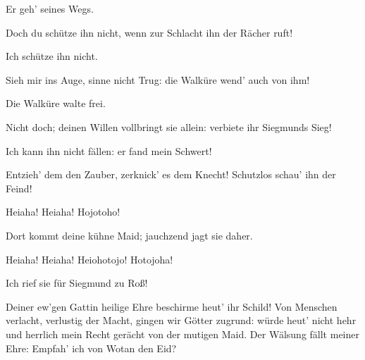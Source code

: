 \begin{drama}
\Wotanspeaks


Er geh' seines Wegs.
 

\Frickaspeaks
Doch du schütze ihn nicht,
wenn zur Schlacht ihn der Rächer ruft!
 

\Wotanspeaks
Ich schütze ihn nicht.
 

\Frickaspeaks
Sieh mir ins Auge, sinne nicht Trug:
die Walküre wend' auch von ihm!
 

\Wotanspeaks
Die Walküre walte frei.
 

\Frickaspeaks
Nicht doch; deinen Willen vollbringt sie allein:
verbiete ihr Siegmunds Sieg!
 

\Wotanspeaks


Ich kann ihn nicht fällen: er fand mein Schwert!
 

\Frickaspeaks
Entzieh' dem den Zauber, zerknick' es dem Knecht!
Schutzlos schau' ihn der Feind!
 

\Brunnhildespeaks


Heiaha! Heiaha! Hojotoho!
 

\Frickaspeaks
Dort kommt deine kühne Maid;
jauchzend jagt sie daher.
 

\Brunnhildespeaks


Heiaha! Heiaha! Heiohotojo! Hotojoha!
 

\Wotanspeaks


Ich rief sie für Siegmund zu Roß!
 




\Frickaspeaks
Deiner ew'gen Gattin heilige Ehre
beschirme heut' ihr Schild!
Von Menschen verlacht, verlustig der Macht,
gingen wir Götter zugrund:
würde heut' nicht hehr und herrlich mein Recht
gerächt von der mutigen Maid.
Der Wälsung fällt meiner Ehre:
Empfah' ich von Wotan den Eid?
 

\Wotanspeaks



\end{drama}
